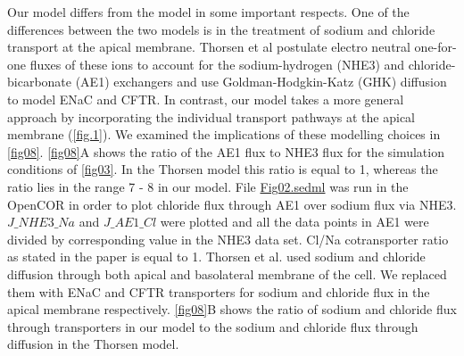 \documentclass[fleqn,10pt]{physiome}
\begin{document}
Our model differs from the \cite{thorsen2014transepithelial} model in some
important respects. One of the differences between the two models is in the
treatment of sodium and chloride transport at the apical membrane. Thorsen
et al postulate electro neutral one-for-one fluxes of these ions to account for the
sodium-hydrogen (NHE3) and chloride-bicarbonate (AE1) exchangers and use
Goldman-Hodgkin-Katz (GHK) diffusion to model ENaC and CFTR. In contrast,
our model takes a more general approach by incorporating the individual
transport pathways at the apical membrane (\autoref{fig.1}). We examined the
implications of these modelling choices in \autoref{fig08}. \autoref{fig08}A shows the
ratio of the AE1 flux to NHE3 flux for the simulation conditions of \autoref{fig03}.
In the Thorsen model this ratio is equal to 1, whereas the ratio lies in the range
7 - 8 in our model. File \href{https://models.physiomeproject.org/workspace/572/file/057757b3a8de9a56b4bd32b8a12a0f00af1d8213/SEDML_files/Fig02.sedml}{Fig02.sedml} was run in the OpenCOR in order to plot chloride flux through AE1 over sodium flux via NHE3. $J\_{NHE3}\_{Na}$ and $J\_{AE1}\_{Cl}$ were plotted and all the data points in AE1 were divided by corresponding value in the NHE3 data set. Cl/Na cotransporter ratio as stated in the paper is equal to 1. Thorsen et al. used sodium and chloride diffusion through both apical and basolateral membrane of the cell. We replaced them with ENaC and CFTR transporters for sodium and chloride flux in the apical membrane respectively. \autoref{fig08}B shows the ratio of sodium and chloride flux through transporters in our model to the sodium and chloride flux through diffusion in the Thorsen model.\newline
\end{document}

